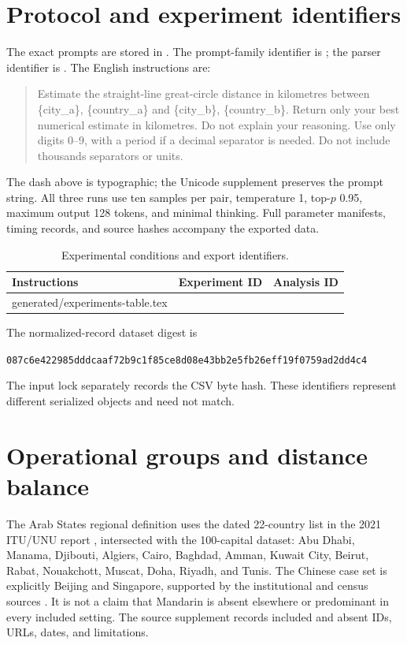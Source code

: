 \documentclass[12pt,a4paper]{article}
\makeatletter
\newcommand{\tableinput}[1]{\@@input #1 }
\makeatother
\begin{document}
\section{Protocol and experiment identifiers}\label{app:protocol}
The exact prompts are stored in . The prompt-family identifier is ; the parser identifier is . The English instructions are:
\begin{quote}\small
Estimate the straight-line great-circle distance in kilometres between \{city\_a\}, \{country\_a\} and \{city\_b\}, \{country\_b\}. Return only your best numerical estimate in kilometres. Do not explain your reasoning. Use only digits 0--9, with a period if a decimal separator is needed. Do not include thousands separators or units.
\end{quote}
The dash above is typographic; the Unicode supplement preserves the prompt string. All three runs use ten samples per pair, temperature 1, top-$p$ 0.95, maximum output 128 tokens, and minimal thinking. Full parameter manifests, timing records, and source hashes accompany the exported data.
\begin{table}[htbp]\centering\small
\caption{Experimental conditions and export identifiers.}
\begin{tabular}{lll}\toprule Instructions & Experiment ID & Analysis ID \\\midrule
\tableinput{generated/experiments-table.tex}
\bottomrule\end{tabular}
\end{table}
\par\noindent\begin{minipage}{\linewidth}
The normalized-record dataset digest is
\begin{center}\scriptsize\texttt{087c6e422985dddcaaf72b9c1f85ce8d08e43bb2e5fb26eff19f0759ad2dd4c4}\end{center}
The input lock separately records the CSV byte hash. These identifiers represent different serialized objects and need not match.
\end{minipage}\par

\section{Operational groups and distance balance}\label{app:groups}
The Arab States regional definition uses the dated 22-country list in the 2021 ITU/UNU report \cite{arabstates}, intersected with the 100-capital dataset: Abu Dhabi, Manama, Djibouti, Algiers, Cairo, Baghdad, Amman, Kuwait City, Beirut, Rabat, Nouakchott, Muscat, Doha, Riyadh, and Tunis. The Chinese case set is explicitly Beijing and Singapore, supported by the institutional and census sources \cite{chinastandard,sgcensus}. It is not a claim that Mandarin is absent elsewhere or predominant in every included setting. The source supplement records included and absent IDs, URLs, dates, and limitations.
\end{document}
